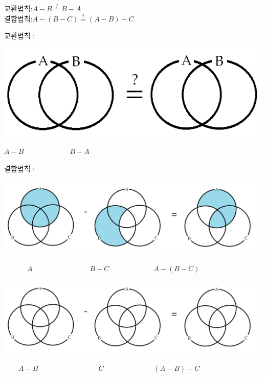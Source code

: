 \documentclass{oblivoir}
\begin{document}
\clearpage
%
교환법칙\::\:\(A-B\stackrel?=B-A\)\\\label{properties5}
결합법칙\::\:\(A-(B-C)\stackrel?=(A-B)-C\)
\begin{mdframed}
교환법칙 :
\par\vspace{-20pt}
\begin{center}
\includegraphics[width=.5\textwidth]{two_set_equality}
\par\(A-B\qquad\qquad\qquad\:\:B-A\)
\end{center}
\par\noindent
결합법칙 :
\par
\includegraphics[width=.9\textwidth]{properties_5}
\par\vspace{-10pt}
\(\qquad\quad\:A\qquad\qquad\qquad\qquad B-C
\qquad\qquad\qquad\:A-(B-C)\)
\par
\includegraphics[width=.9\textwidth]{three_set_rule_setminus}
\par\vspace{-10pt}
\(\qquad A-B\qquad\qquad\qquad\qquad\:\: C
\qquad\qquad\qquad\quad(A-B)-C\)
\par
\end{mdframed}
\newpage

\end{document}
